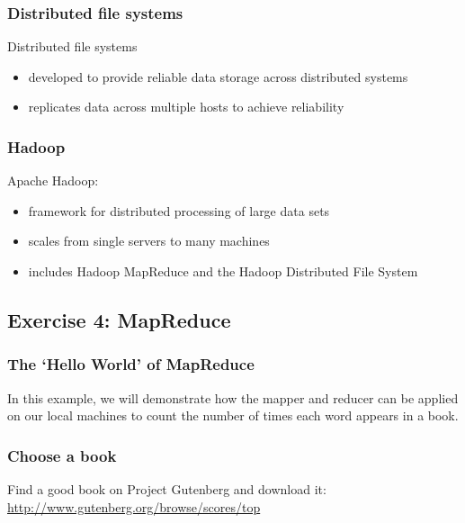 \subsubsection{Distributed file systems}\label{distributed-file-systems}

Distributed file systems

\begin{itemize}
\itemsep1pt\parskip0pt
\item
  developed to provide reliable data storage across distributed systems
\item
  replicates data across multiple hosts to achieve reliability
\end{itemize}

\subsubsection{Hadoop}\label{hadoop}

Apache Hadoop:

\begin{itemize}
\itemsep1pt\parskip0pt
\item
  framework for distributed processing of large data sets
\item
  scales from single servers to many machines
\item
  includes Hadoop MapReduce and the Hadoop Distributed File System
\end{itemize}

\subsection{Exercise 4: MapReduce}\label{exercise-4-mapreduce}

\subsubsection{The `Hello World' of
MapReduce}\label{the-hello-world-of-mapreduce}

In this example, we will demonstrate how the mapper and reducer can be
applied on our local machines to count the number of times each word
appears in a book.

\subsubsection{Choose a book}\label{choose-a-book}

Find a good book on Project Gutenberg and download it:
\url{http://www.gutenberg.org/browse/scores/top}

